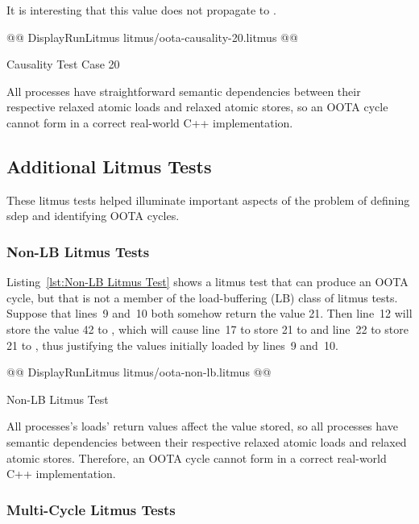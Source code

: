 \documentclass[10]{article}
\begin{document}
It is interesting that this  value does not propagate to
.

\begin{listing}[tbp]
@@ DisplayRunLitmus litmus/oota-causality-20.litmus @@
\caption{Causality Test Case 20}
\label{lst:Causality Test Case 20}
\end{listing}

All processes have straightforward semantic dependencies between their
respective relaxed atomic loads and relaxed atomic stores, so an OOTA
cycle cannot form in a correct real-world C++ implementation.

\subsection{Additional Litmus Tests}
\label{app:Additional Litmus Tests}

These litmus tests helped illuminate important aspects of the problem
of defining sdep and identifying OOTA cycles.

\subsubsection{Non-LB Litmus Tests}
\label{app:Non-LB Litmus Tests}

Listing~\ref{lst:Non-LB Litmus Test}
shows a litmus test that can produce an OOTA cycle, but that is not
a member of the load-buffering (LB) class of litmus tests.
Suppose that lines~9 and~10 both somehow return the value 21.
Then line~12 will store the value 42 to , which will cause
line~17 to store 21 to  and line~22 to store 21 to ,
thus justifying the values initially loaded by lines~9 and~10.

\begin{listing}[tbp]
@@ DisplayRunLitmus litmus/oota-non-lb.litmus @@
\caption{Non-LB Litmus Test}
\label{lst:Non-LB Litmus Test}
\end{listing}

All processes's loads' return values affect the value stored, so all
processes have semantic dependencies between their respective relaxed
atomic loads and relaxed atomic stores.
Therefore, an OOTA cycle cannot form in a correct real-world C++
implementation.

\subsubsection{Multi-Cycle Litmus Tests}
\label{app:Multi-Cycle Litmus Tests}
\end{document}
